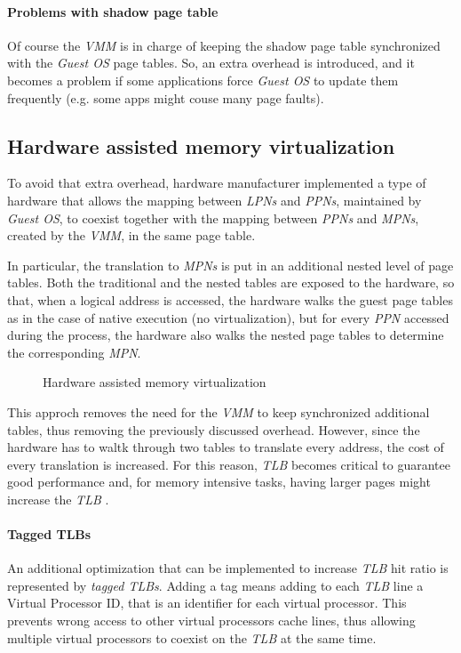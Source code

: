 \paragraph{Problems with shadow page table}
Of course the \emph{VMM} is in charge of keeping the shadow page table
synchronized with the \emph{Guest OS} page tables. So, an extra overhead is
introduced, and it becomes a problem if some applications force \emph{Guest OS} to
update them frequently (e.g. some apps might couse many page faults).

\subsection{Hardware assisted memory virtualization}
To avoid that extra overhead, hardware manufacturer implemented a type of hardware
that allows the mapping between \emph{LPNs} and \emph{PPNs}, maintained by
\emph{Guest OS}, to coexist together with the mapping between \emph{PPNs} and
\emph{MPNs}, created by the \emph{VMM}, in the same page table.

In particular, the translation to \emph{MPNs} is put in an additional nested level
of page tables. Both the traditional and the nested tables are exposed to the
hardware, so that, when a logical address is accessed, the hardware walks the
guest page tables as in the case of native execution (no virtualization), but for
every \emph{PPN} accessed during the process, the hardware also walks the
nested page tables to determine the corresponding \emph{MPN}.

\begin{figure}[h!]
    \centering
    \caption{Hardware assisted memory virtualization}
\end{figure}

\noindent
This approch removes the need for the \emph{VMM} to keep synchronized additional
tables, thus removing the previously discussed overhead. However, since the
hardware has to waltk through two tables to translate every address, the cost of
every translation is increased. For this reason, \emph{TLB} becomes critical to
guarantee good performance and, for memory intensive tasks, having larger pages
might increase the \emph{TLB} .

\paragraph{Tagged TLBs}
An additional optimization that can be implemented to increase \emph{TLB} hit
ratio is represented by \emph{tagged TLBs}. Adding a tag means adding to each
\emph{TLB} line a Virtual Processor ID, that is an identifier for each virtual
processor. This prevents wrong access to other virtual processors cache lines,
thus allowing multiple virtual processors to coexist on the \emph{TLB} at the
same time.

